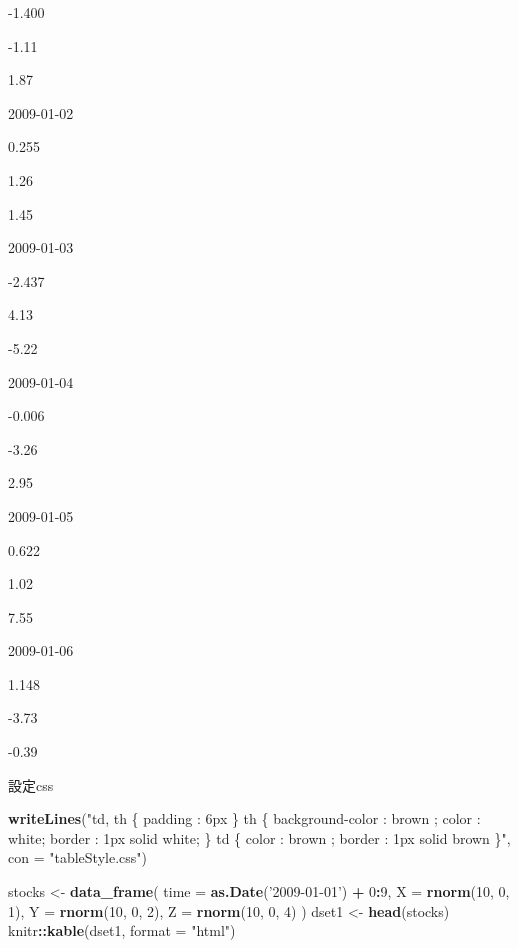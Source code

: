 \documentclass[]{book}
\newenvironment{Shaded}{\begin{snugshade}}{\end{snugshade}}
\newcommand{\DataTypeTok}[1]{\textcolor[rgb]{0.13,0.29,0.53}{#1}}
\newcommand{\DecValTok}[1]{\textcolor[rgb]{0.00,0.00,0.81}{#1}}
\newcommand{\KeywordTok}[1]{\textcolor[rgb]{0.13,0.29,0.53}{\textbf{#1}}}
\newcommand{\NormalTok}[1]{#1}
\newcommand{\OperatorTok}[1]{\textcolor[rgb]{0.81,0.36,0.00}{\textbf{#1}}}
\newcommand{\StringTok}[1]{\textcolor[rgb]{0.31,0.60,0.02}{#1}}
\theoremstyle{definition}
\theoremstyle{definition}
\theoremstyle{definition}
\theoremstyle{remark}
\begin{document}
-1.400

-1.11

1.87

2009-01-02

0.255

1.26

1.45

2009-01-03

-2.437

4.13

-5.22

2009-01-04

-0.006

-3.26

2.95

2009-01-05

0.622

1.02

7.55

2009-01-06

1.148

-3.73

-0.39

設定css

\begin{Shaded}
\begin{Highlighting}[]
\KeywordTok{writeLines}\NormalTok{(}\StringTok{"td, th \{ padding : 6px \} th \{ background-color : brown ; color : white; border : 1px solid white; \} td \{ color : brown ; border : 1px solid brown \}"}\NormalTok{, }\DataTypeTok{con =} \StringTok{"tableStyle.css"}\NormalTok{)}
\end{Highlighting}
\end{Shaded}

\begin{Shaded}
\begin{Highlighting}[]
\NormalTok{stocks <-}\StringTok{ }\KeywordTok{data_frame}\NormalTok{(}
  \DataTypeTok{time =} \KeywordTok{as.Date}\NormalTok{(}\StringTok{'2009-01-01'}\NormalTok{) }\OperatorTok{+}\StringTok{ }\DecValTok{0}\OperatorTok{:}\DecValTok{9}\NormalTok{,}
  \DataTypeTok{X =} \KeywordTok{rnorm}\NormalTok{(}\DecValTok{10}\NormalTok{, }\DecValTok{0}\NormalTok{, }\DecValTok{1}\NormalTok{),}
  \DataTypeTok{Y =} \KeywordTok{rnorm}\NormalTok{(}\DecValTok{10}\NormalTok{, }\DecValTok{0}\NormalTok{, }\DecValTok{2}\NormalTok{),}
  \DataTypeTok{Z =} \KeywordTok{rnorm}\NormalTok{(}\DecValTok{10}\NormalTok{, }\DecValTok{0}\NormalTok{, }\DecValTok{4}\NormalTok{)}
\NormalTok{)}
\NormalTok{dset1 <-}\StringTok{ }\KeywordTok{head}\NormalTok{(stocks)}
\NormalTok{knitr}\OperatorTok{::}\KeywordTok{kable}\NormalTok{(dset1, }\DataTypeTok{format =} \StringTok{"html"}\NormalTok{)}
\end{Highlighting}
\end{Shaded}
\end{document}
